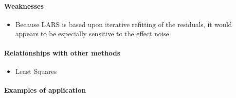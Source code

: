 \paragraph{Weaknesses}
\begin{itemize}
    \item Because LARS is based upon iterative refitting of the residuals, it would
		appears to be especially sensitive to the effect noise.
\end{itemize}

\paragraph{Relationships with other methods}
\begin{itemize}
    \item Least Squares
\end{itemize}

\paragraph{Examples of application}


